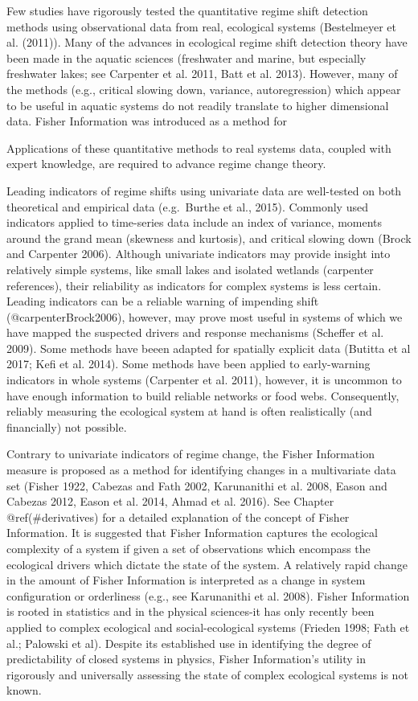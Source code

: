 \documentclass[12pt,twoside,openany]{reedthesis}
\begin{document}
Few studies have rigorously tested the quantitative regime shift
detection methods using observational data from real, ecological systems
(Bestelmeyer et al. (2011)). Many of the advances in ecological regime
shift detection theory have been made in the aquatic sciences
(freshwater and marine, but especially freshwater lakes; see Carpenter
et al. 2011, Batt et al. 2013). However, many of the methods (e.g.,
critical slowing down, variance, autoregression) which appear to be
useful in aquatic systems do not readily translate to higher dimensional
data. Fisher Information was introduced as a method for

Applications of these quantitative methods to real systems data, coupled
with expert knowledge, are required to advance regime change theory.

Leading indicators of regime shifts using univariate data are
well-tested on both theoretical and empirical data (e.g.~Burthe et al.,
2015). Commonly used indicators applied to time-series data include an
index of variance, moments around the grand mean (skewness and
kurtosis), and critical slowing down (Brock and Carpenter 2006).
Although univariate indicators may provide insight into relatively
simple systems, like small lakes and isolated wetlands (carpenter
references), their reliability as indicators for complex systems is less
certain. Leading indicators can be a reliable warning of impending shift
(@carpenterBrock2006), however, may prove most useful in systems of
which we have mapped the suspected drivers and response mechanisms
(Scheffer et al. 2009). Some methods have beeen adapted for spatially
explicit data (Butitta et al 2017; Kefi et al. 2014). Some methods have
been applied to early-warning indicators in whole systems (Carpenter et
al. 2011), however, it is uncommon to have enough information to build
reliable networks or food webs. Consequently, reliably measuring the
ecological system at hand is often realistically (and financially) not
possible.

Contrary to univariate indicators of regime change, the Fisher
Information measure is proposed as a method for identifying changes in a
multivariate data set (Fisher 1922, Cabezas and Fath 2002, Karunanithi
et al. 2008, Eason and Cabezas 2012, Eason et al. 2014, Ahmad et al.
2016). See Chapter @ref(\#derivatives) for a detailed explanation of the
concept of Fisher Information. It is suggested that Fisher Information
captures the ecological complexity of a system if given a set of
observations which encompass the ecological drivers which dictate the
state of the system. A relatively rapid change in the amount of Fisher
Information is interpreted as a change in system configuration or
orderliness (e.g., see Karunanithi et al. 2008). Fisher Information is
rooted in statistics and in the physical sciences-it has only recently
been applied to complex ecological and social-ecological systems
(Frieden 1998; Fath et al.; Palowski et al). Despite its established use
in identifying the degree of predictability of closed systems in
physics, Fisher Information's utility in rigorously and universally
assessing the state of complex ecological systems is not known.
\end{document}
